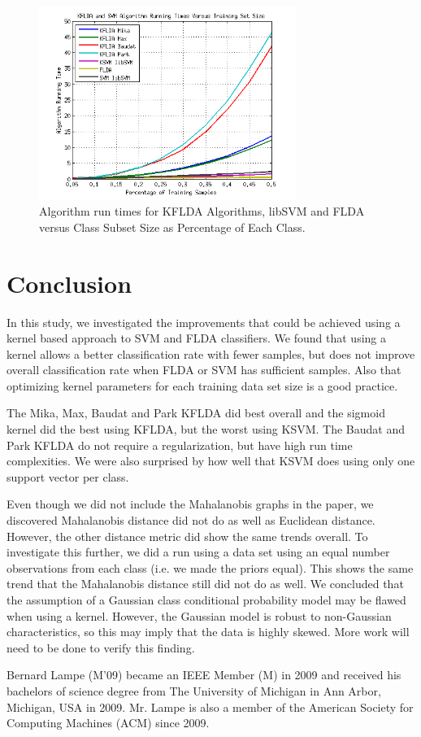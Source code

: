 \documentclass[journal]{IEEEtran}
\begin{document}
\begin{figure}[!h]
\centering
\includegraphics[width=3.3in]{../images/alg_times.png}
\caption{Algorithm run times for KFLDA Algorithms, libSVM and FLDA versus Class Subset Size as Percentage of Each Class.}
\label{fig:alg_times}
\end{figure}

\section{Conclusion}
\par In this study, we investigated the improvements that could be achieved using a kernel based approach to SVM and FLDA classifiers. We found that using a kernel allows a better classification rate with fewer samples, but does not improve overall classification rate when FLDA or SVM has sufficient samples. Also that optimizing kernel parameters for each training data set size is a good practice.
\par The Mika, Max, Baudat and Park KFLDA did best overall and the sigmoid kernel did the best using KFLDA, but the worst using KSVM. The Baudat and Park KFLDA do not require a regularization, but have high run time complexities. We were also surprised by how well that KSVM does using only one support vector per class.
\par Even though we did not include the Mahalanobis graphs in the paper, we discovered Mahalanobis distance did not do as well as Euclidean distance. However, the other distance metric did show the same trends overall. To investigate this further, we did a run using a data set using an equal number observations from each class (i.e. we made the priors equal). This shows the same trend that the Mahalanobis distance still did not do as well. We concluded that the assumption of a Gaussian class conditional probability model may be flawed when using a kernel. However, the Gaussian model is robust to non-Gaussian characteristics, so this may imply that the data is highly skewed. More work will need to be done to verify this finding.




\begin{IEEEbiographynophoto}{Bernard Lampe}
(M'09) became an IEEE Member (M) in 2009 and received his bachelors of science degree from The University of Michigan in Ann Arbor, Michigan, USA in 2009. Mr. Lampe is also a member of the American Society for Computing Machines (ACM) since 2009.
\end{IEEEbiographynophoto}

\end{document}
